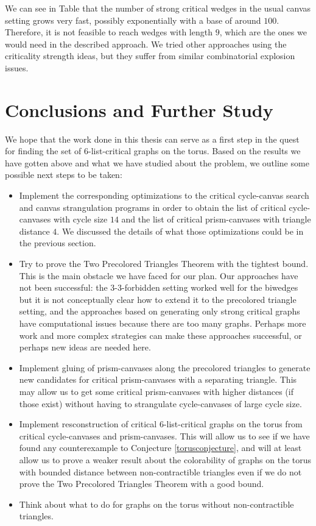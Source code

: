 We can see in Table \cite{tab:strongwedges} that the number of strong critical wedges in the usual
canvas setting grows very fast, possibly exponentially with a base of around $100$. Therefore,
it is not feasible to reach wedges with length $9$, which are the ones we would need in the described 
approach. We tried other approaches using the
criticality strength ideas, but they suffer from similar combinatorial explosion issues. 

\section{Conclusions and Further Study}

We hope that the work done in this thesis can serve as a first step in the quest for finding the
set of 6-list-critical graphs on the torus. Based on the results we have gotten above and what 
we have studied about the problem, we outline some possible next steps to be taken:

\begin{itemize}
	\item Implement the corresponding optimizations to the critical cycle-canvas search and
	canvas strangulation programs in order to obtain the list of critical cycle-canvases with
	cycle size $14$ and the list of critical prism-canvases with triangle distance $4$. 
	We discussed the details of what those optimizations could be in the previous 
	section.
	\item Try to prove the Two Precolored Triangles Theorem with the tightest bound. 
	This is the main obstacle we have faced for our plan. 
	Our approaches have not been successful: the 3-3-forbidden
	setting worked well for the biwedges but it is not conceptually clear how to extend
	it to the precolored triangle setting, and the approaches based on generating only strong
	critical graphs have computational issues because there are too many graphs. Perhaps
	more work and more complex strategies can make these approaches successful, or
	perhaps new ideas are needed here.
	\item Implement gluing of prism-canvases along the precolored triangles to generate
	new candidates for critical prism-canvases with a separating triangle. This may allow
	us to get some critical prism-canvases with higher distances (if those exist) without
	having to strangulate cycle-canvases of large cycle size.
	\item Implement resconstruction of critical $6$-list-critical graphs on the torus
	from critical cycle-canvases and prism-canvases. This will allow us to see if we have
	found any counterexample to Conjecture \ref{torusconjecture}, and will at least allow
	us to prove a weaker result about the colorability of graphs on the torus with bounded
	distance between non-contractible triangles even if we do not prove the Two Precolored
	Triangles Theorem with a good bound. 
	\item Think about what to do for graphs on the torus without non-contractible triangles.
	
\end{itemize}






